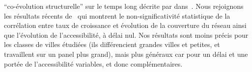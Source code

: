 ``co-évolution structurelle'' sur le temps long décrite par  dans~\cite{espacegeo2014effets}. Nous rejoignons les résultats récents de~\cite{mimeur:hal-01616746} qui montrent le non-significativité statistique de la corrélation entre taux de croissance et évolution de la couverture du réseau ainsi que l'évolution de l'accessibilité, à délai nul. Nos résultats sont moins précis pour les classes de villes étudiées (ils différencient grandes villes et petites, et travaillent sur un panel plus grand), mais plus généraux car pour un délai et une portée de l'accessibilité variables, et donc complémentaires.





